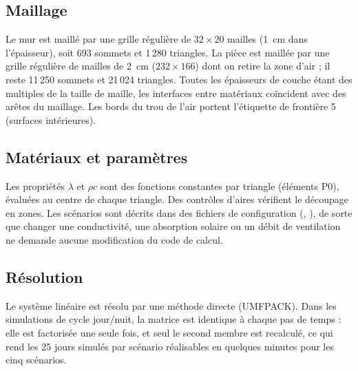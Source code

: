 \subsection{Maillage}
Le mur est maillé par une grille régulière de $32\times20$ mailles (1~cm dans l'épaisseur), soit 693 sommets et
1\,280 triangles. La pièce est maillée par une grille régulière de mailles de 2~cm ($232\times166$) dont on
retire la zone d'air ; il reste 11\,250 sommets et 21\,024 triangles. Toutes les épaisseurs de couche étant
des multiples de la taille de maille, les interfaces entre matériaux coïncident avec des arêtes du maillage.
Les bords du trou de l'air portent l'étiquette de frontière 5 (surfaces intérieures).

\subsection{Matériaux et paramètres}
Les propriétés $\lambda$ et $\rho c$ sont des fonctions constantes par triangle (éléments P0), évaluées au
centre de chaque triangle. Des contrôles d'aires vérifient le découpage en zones. Les scénarios sont décrits
dans des fichiers de configuration (, ), de sorte que
changer une conductivité, une absorption solaire ou un débit de ventilation ne demande aucune modification
du code de calcul.

\subsection{Résolution}
Le système linéaire est résolu par une méthode directe (UMFPACK). Dans les simulations de cycle jour/nuit,
la matrice est identique à chaque pas de temps : elle est factorisée une seule fois, et seul le second
membre est recalculé, ce qui rend les 25 jours simulés par scénario réalisables en quelques minutes pour
les cinq scénarios.
